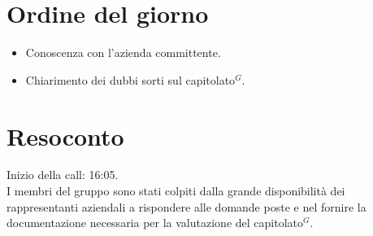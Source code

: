 \section{Ordine del giorno}
\begin{itemize}
    \item Conoscenza con l'azienda committente.
    \item Chiarimento dei dubbi sorti sul capitolato$^{G}$.
\end{itemize}

\section{Resoconto}
Inizio della call: 16:05.\\
I membri del gruppo sono stati colpiti dalla grande disponibilità dei rappresentanti aziendali a 
rispondere alle domande poste e nel fornire la documentazione necessaria per la valutazione del capitolato$^{G}$.


